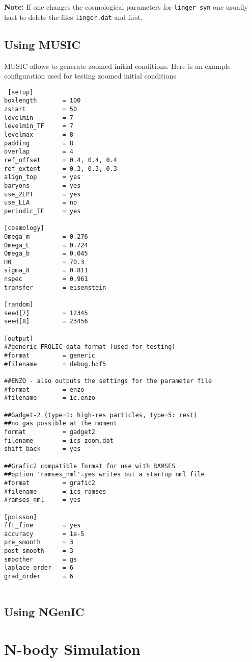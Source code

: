 \documentclass[a4paper,english,10.5pt]{scrartcl}
\begin{document}
\begin{description}
\textbf{Note: } If one changes the cosmological parameters for 
\texttt{linger\_syn} one usually hast to delete the files \texttt{linger.dat} 
and  first. 

\end{description}

\subsection{Using MUSIC}
MUSIC allows to generate zoomed initial conditions. Here is an example configuration used for testing zoomed initial conditions
\begin{verbatim}
 [setup]
boxlength		= 100
zstart			= 50
levelmin		= 7
levelmin_TF		= 7
levelmax		= 8
padding			= 8 
overlap			= 4
ref_offset		= 0.4, 0.4, 0.4
ref_extent		= 0.3, 0.3, 0.3
align_top		= yes
baryons			= yes
use_2LPT		= yes
use_LLA			= no
periodic_TF		= yes

[cosmology]
Omega_m			= 0.276
Omega_L			= 0.724
Omega_b			= 0.045
H0				= 70.3
sigma_8			= 0.811
nspec			= 0.961
transfer		= eisenstein

[random]
seed[7]			= 12345
seed[8]			= 23456

[output]
##generic FROLIC data format (used for testing)
#format			= generic
#filename		= debug.hdf5

##ENZO - also outputs the settings for the parameter file
#format			= enzo
#filename		= ic.enzo

##Gadget-2 (type=1: high-res particles, type=5: rest)
##no gas possible at the moment
format			= gadget2
filename		= ics_zoom.dat
shift_back      = yes

##Grafic2 compatible format for use with RAMSES
##option 'ramses_nml'=yes writes out a startup nml file
#format			= grafic2	
#filename		= ics_ramses
#ramses_nml     = yes

[poisson]
fft_fine		= yes
accuracy		= 1e-5
pre_smooth		= 3
post_smooth		= 3
smoother		= gs
laplace_order	= 6
grad_order		= 6


\end{verbatim}


\subsection{Using NGenIC}

\section{N-body Simulation}
\end{document}
